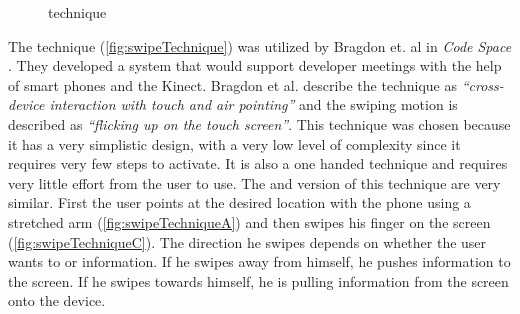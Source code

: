 \begin{figure}[H]
	\caption{\push \grab technique}
	\label{fig:grabTechnique}
\end{figure}

The \swipe technique (\cref{fig:swipeTechnique}) was utilized by Bragdon et. al in \emph{Code Space} \cite{Bragdon:2011}.
They developed a system that would support developer meetings with the help of smart phones and the Kinect. 
Bragdon et al. describe the technique as \emph{``cross-device interaction with touch and air pointing''} and the swiping motion is described as \emph{``flicking up on the touch screen''}.
This technique was chosen because it has a very simplistic design, with a very low level of complexity since it requires very few steps to activate.
It is also a one handed technique and requires very little effort from the user to use.
The \push and \pull version of this technique are very similar.
First the user points at the desired location with the phone using a stretched arm (\cref{fig:swipeTechniqueA}) and then swipes his finger on the screen (\cref{fig:swipeTechniqueC}).
The direction he swipes depends on whether the user wants to \push or \pull information.
If he swipes away from himself, he pushes information to the screen.
If he swipes towards himself, he is pulling information from the screen onto the device.  

